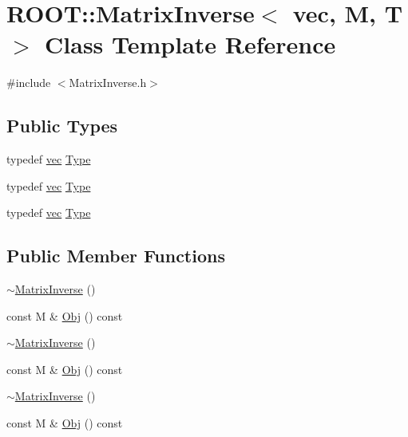 \hypertarget{classROOT_1_1Minuit2_1_1MatrixInverse_3_01vec_00_01M_00_01T_01_4}{}\section{R\+O\+OT\+:\+:Matrix\+Inverse$<$ vec, M, T $>$ Class Template Reference}
\label{classROOT_1_1Minuit2_1_1MatrixInverse_3_01vec_00_01M_00_01T_01_4}


{\ttfamily \#include $<$Matrix\+Inverse.\+h$>$}

\subsection*{Public Types}
\begin{DoxyCompactItemize}
\item 
typedef \mbox{\hyperlink{classROOT_1_1Minuit2_1_1vec}{vec}} \mbox{\hyperlink{classROOT_1_1Minuit2_1_1MatrixInverse_3_01vec_00_01M_00_01T_01_4_ae925e39424dcc097f76d033365b06efd}{Type}}
\item 
typedef \mbox{\hyperlink{classROOT_1_1Minuit2_1_1vec}{vec}} \mbox{\hyperlink{classROOT_1_1Minuit2_1_1MatrixInverse_3_01vec_00_01M_00_01T_01_4_ae925e39424dcc097f76d033365b06efd}{Type}}
\item 
typedef \mbox{\hyperlink{classROOT_1_1Minuit2_1_1vec}{vec}} \mbox{\hyperlink{classROOT_1_1Minuit2_1_1MatrixInverse_3_01vec_00_01M_00_01T_01_4_ae925e39424dcc097f76d033365b06efd}{Type}}
\end{DoxyCompactItemize}
\subsection*{Public Member Functions}
\begin{DoxyCompactItemize}
\item 
\mbox{\hyperlink{classROOT_1_1Minuit2_1_1MatrixInverse_3_01vec_00_01M_00_01T_01_4_ad267e62bc46dd1bab57b3194bd850be9}{$\sim$\+Matrix\+Inverse}} ()
\item 
const M \& \mbox{\hyperlink{classROOT_1_1Minuit2_1_1MatrixInverse_3_01vec_00_01M_00_01T_01_4_a9d034050e7fbadfbbf24613a54c8ed93}{Obj}} () const
\item 
\mbox{\hyperlink{classROOT_1_1Minuit2_1_1MatrixInverse_3_01vec_00_01M_00_01T_01_4_ad267e62bc46dd1bab57b3194bd850be9}{$\sim$\+Matrix\+Inverse}} ()
\item 
const M \& \mbox{\hyperlink{classROOT_1_1Minuit2_1_1MatrixInverse_3_01vec_00_01M_00_01T_01_4_a9d034050e7fbadfbbf24613a54c8ed93}{Obj}} () const
\item 
\mbox{\hyperlink{classROOT_1_1Minuit2_1_1MatrixInverse_3_01vec_00_01M_00_01T_01_4_ad267e62bc46dd1bab57b3194bd850be9}{$\sim$\+Matrix\+Inverse}} ()
\item 
const M \& \mbox{\hyperlink{classROOT_1_1Minuit2_1_1MatrixInverse_3_01vec_00_01M_00_01T_01_4_a9d034050e7fbadfbbf24613a54c8ed93}{Obj}} () const
\end{DoxyCompactItemize}


